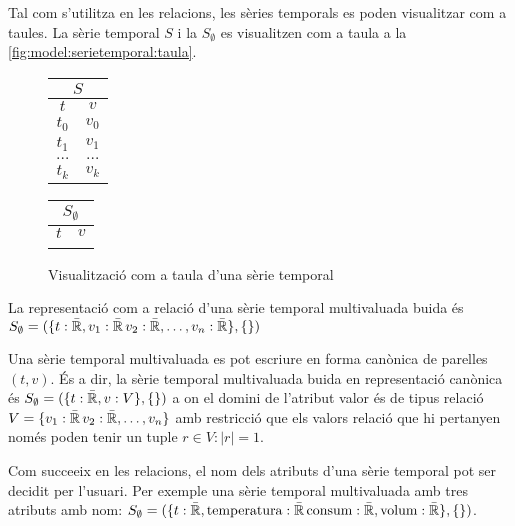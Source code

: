 Tal com s'utilitza en les relacions, les sèries temporals es poden
visualitzar com a taules. La sèrie temporal $S$ i la $S_{\emptyset}$
es visualitzen com a taula a la
\autoref{fig:model:serietemporal:taula}.

\begin{figure}[tp]
  \centering
  \begin{tabular}[c]{|c|c|}
    \multicolumn{2}{c}{$S$} \\ \hline
    $t$  & $v$ \\ \hline
    $t_0$  & $v_0$ \\
    $t_1$  & $v_1$ \\
    $\dots$  & $\dots$ \\ 
    $t_k$  & $v_k$ \\ \hline
  \end{tabular} \qquad
  \begin{tabular}[c]{|c|c|}
    \multicolumn{2}{c}{$S_{\emptyset}$} \\ \hline
    $t$  & $v$ \\ \hline
      &  \\ \hline
  \end{tabular}
  \caption{Visualització com a taula d'una sèrie temporal}
  \label{fig:model:serietemporal:taula}
\end{figure}




\begin{definition}
  La representació com a relació d'una sèrie temporal multivaluada buida és
  $S_{\emptyset} = ( \{t: \bar{\mathbb{R}{}}, v_1: \bar{\mathbb{R}{}}\,
  v_2: \bar{\mathbb{R}{}}, \dotsc, v_n: \bar{\mathbb{R}{}}\}, \{ \} )$

  Una sèrie temporal multivaluada es pot escriure en forma canònica de
  parelles $(t,v)$. És a dir, la sèrie temporal multivaluada buida en
  representació canònica és $S_{\emptyset} = ( \{t: \bar{\mathbb{R}{}},
  v: V \}, \{ \} )$ a on el domini de l'atribut valor és de tipus
  relació $V = \{ v_1: \bar{\mathbb{R}{}}\, v_2: \bar{\mathbb{R}{}},
  \dotsc, v_n \}$ amb restricció que els valors relació que hi
  pertanyen només poden tenir un tuple $r \in V: |r| = 1$.
\end{definition}

Com succeeix en les relacions, el nom dels atributs d'una sèrie
temporal pot ser decidit per l'usuari. Per exemple una sèrie temporal
multivaluada amb tres atributs amb nom: $S_{\emptyset} = ( \{t:
\bar{\mathbb{R}{}}, \text{temperatura}: \bar{\mathbb{R}{}}\,
\text{consum}: \bar{\mathbb{R}{}}, \text{volum}: \bar{\mathbb{R}{}}\}, \{
\} )$.



